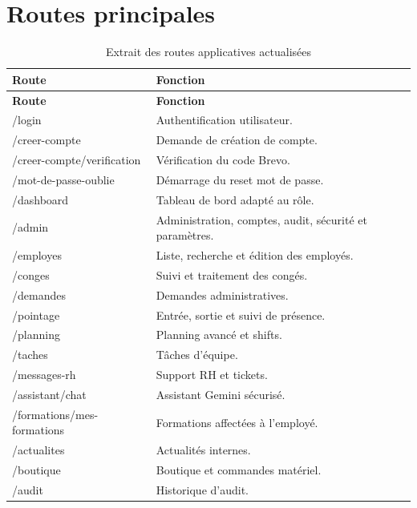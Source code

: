 \documentclass[12pt,a4paper]{report}
\begin{document}
\section{Routes principales}
\begin{longtable}{p{5cm}p{9cm}}
\caption{Extrait des routes applicatives actualisées}\label{tab:routes}\\
\toprule
\textbf{Route} & \textbf{Fonction}\\
\midrule
\endfirsthead
\toprule
\textbf{Route} & \textbf{Fonction}\\
\midrule
\endhead
/login & Authentification utilisateur.\\
/creer-compte & Demande de création de compte.\\
/creer-compte/verification & Vérification du code Brevo.\\
/mot-de-passe-oublie & Démarrage du reset mot de passe.\\
/dashboard & Tableau de bord adapté au rôle.\\
/admin & Administration, comptes, audit, sécurité et paramètres.\\
/employes & Liste, recherche et édition des employés.\\
/conges & Suivi et traitement des congés.\\
/demandes & Demandes administratives.\\
/pointage & Entrée, sortie et suivi de présence.\\
/planning & Planning avancé et shifts.\\
/taches & Tâches d'équipe.\\
/messages-rh & Support RH et tickets.\\
/assistant/chat & Assistant Gemini sécurisé.\\
/formations/mes-formations & Formations affectées à l'employé.\\
/actualites & Actualités internes.\\
/boutique & Boutique et commandes matériel.\\
/audit & Historique d'audit.\\
\bottomrule
\end{longtable}
\end{document}
